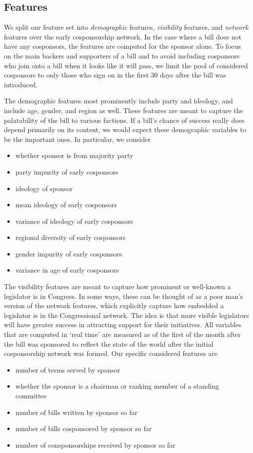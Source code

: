 \subsection{Features}

We split our feature set into \textit{demographic} features, \textit{visibility}
features, and \textit{network} features over the early cosponsorship network. In
the case where a bill does not have any cosponsors, the features are computed
for the sponsor alone. To focus on the main backers and supporters of a bill and
to avoid including cosponsors who join onto a bill when it looks like it will
pass, we limit the pool of considered cosponsors to only those who sign on in
the first 30 days after the bill was introduced.

The demographic features most prominently include party and ideology, and
include age, gender, and region as well. These features are meant to capture the
palatability of the bill to various factions. If a bill's chance of success
really does depend primarily on its content, we would expect these demographic
variables to be the important ones. In particular, we consider
\begin{itemize}
	\item whether sponsor is from majority party
	\item party impurity of early cosponsors
	\item ideology of sponsor
	\item mean ideology of early cosponsors
	\item variance of ideology of early cosponsors
	\item regional diversity of early cosponsors
	\item gender impurity of early cosponsors
	\item variance in age of early cosponsors
\end{itemize}

The visibility features are meant to capture how prominent or well-known a
legislator is in Congress. In some ways, these can be thought of as a poor man's
version of the network features, which explicitly capture how embedded a
legislator is in the Congressional network. The idea is that more visible
legislators will have greater success in attracting support for their
initiatives. All variables that are computed in `real time' are measured as of
the first of the month after the bill was sponsored to reflect the state of the
world after the initial cosponsorship network was formed. Our specific
considered features are
\begin{itemize}
	\item number of terms served by sponsor
	\item whether the sponsor is a chairman or ranking member of a standing committee
	\item number of bills written by sponsor so far
	\item number of bills cosponsored by sponsor so far
	\item number of consponsorships received by sponsor so far
\end{itemize}

